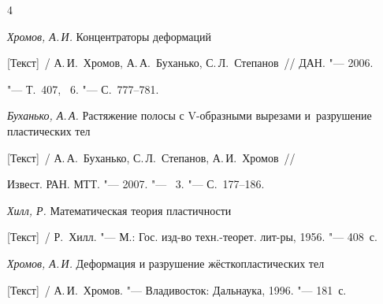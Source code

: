 \begin{thebibliography}{4}

\item  \textit{Хромов, А.\,И.} Концентраторы деформаций 

[Текст]~/ А.\,И.~Хромов, А.\,А.~Буханько, С.\,Л.~Степанов~/\!/ ДАН. "--- 2006.

"--- Т.~407, \No~6. "--- С.~777--781.



\item  \textit{Буханько, А.\,А.} Растяжение полосы с V-образными вырезами и~разрушение пластических тел 

[Текст]~/ А.\,А.~Буханько, С.\,Л.~Степанов, А.\,И.~Хромов~/\!/ 

Извест. РАН. МТТ. "--- 2007. "--- \No~3. "--- С.~177--186.



\item  \textit{Хилл, Р.} Математическая теория пластичности

[Текст]~/ Р.~Хилл. "--- М.: Гос. изд-во техн.-теорет. лит-ры, 1956. "--- 408~с.



\item  \textit{Хромов, А.\,И.} Деформация и разрушение жёсткопластических тел

[Текст]~/ А.\,И.~Хромов. "--- Владивосток: Дальнаука, 1996. "--- 181~с.



\end{thebibliography}



\vspace{7mm}

  \lfoot[]{}

  \rfoot[]{}



\makeengtitle





%

